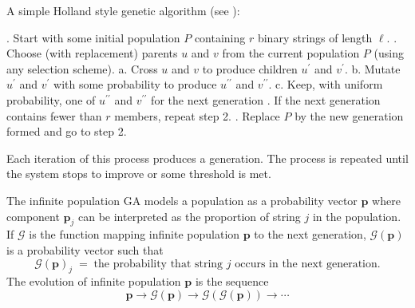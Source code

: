 A simple Holland style genetic algorithm (see \cite{Holland1975}):
\begin{algorithm}
\label{realGA}
\caption*{}
\begin{algorithmic}[1]
. Start with some initial population $P$ containing $r$ binary strings of length $\ell$.
. Choose (with replacement) parents $u$ and $v$ from the current population $P$ (using any selection scheme).
  \Statex \hspace{\algorithmicindent} a. Cross $u$ and $v$ to produce children $u^\prime$ and $v^\prime$.
  \Statex \hspace{\algorithmicindent} b. Mutate $u^\prime$ and $v^\prime$ with some probability to produce $u^{\prime\prime}$ and $v^{\prime\prime}$.
  \Statex \hspace{\algorithmicindent} c. Keep, with uniform probability, one of $u^{\prime\prime}$ and $v^{\prime\prime}$ for the next generation 
. If the next generation contains fewer than $r$ members, repeat step 2.
. Replace $P$ by the new generation formed and go to step 2.
\end{algorithmic}
\end{algorithm}
Each iteration of this process produces a generation. 
The process is repeated until the system stops to improve or some threshold is met.

The infinite population GA models a population as a probability vector $\bm{p}$ where component $\bm{p}_j$ 
can be interpreted as the proportion of string $j$ in the population. If $\mathcal{G}$ is the function mapping infinite population $\bm{p}$ to 
the next generation, $\mathcal{G}(\bm{p})$ is a probability vector such that 
\[
\mathcal{G}(\bm{p})_j \; = \; \text{the probability that string $j$ occurs in the next generation}.
\]
The evolution of infinite population $\bm{p}$ is the sequence
\[ \bm{p} \to \mathcal{G}(\bm{p}) \to  {\mathcal{G}}(\mathcal{G}(\bm{p})) \to \cdots \]

